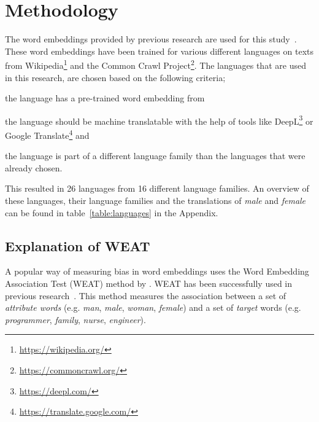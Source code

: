 \section{Methodology} \label{ch:method}
The word embeddings provided by previous research are used for this
study~\parencite{grave2018learning}.
These word embeddings have been
trained for various different languages on texts from
Wikipedia\footnote{\url{https://wikipedia.org/}} and
the Common Crawl Project\footnote{\url{https://commoncrawl.org/}}.
The languages that are used in this research, are chosen based on the
following criteria;
\begin{enumerate*}[label={(\alph*)}]
    \item the language has a pre-trained word embedding from \textcite{grave2018learning}
    \item the language should be machine translatable with the help of tools like
        DeepL\footnote{\url{https://deepl.com/}} or
        Google Translate\footnote{\url{https://translate.google.com/}} and
    \item the language is part of a different language family than the languages that
    were already chosen.
\end{enumerate*}
This resulted in 26 languages from 16 different language families. An overview of these languages, their language families and the translations of \textit{male} and \textit{female}
can be found in table~\ref{table:languages} in the Appendix.

\subsection{Explanation of WEAT} \label{section:method:weat}
A popular way of measuring bias in word embeddings uses the 
Word Embedding Association Test (WEAT) method by
\textcite{caliskan_2017_semantics_language_corpora}. 
WEAT has been successfully used in previous research~\parencite{gonen-goldberg-2019-lipstick-pig, 10.1145/3306618.3314270}.
This method measures the
association between a set of \textit{attribute words} (e.g. \textit{man}, \textit{male},
\textit{woman}, \textit{female}) 
and a set of \textit{target} words (e.g. \textit{programmer}, \textit{family},
\textit{nurse}, \textit{engineer}). 

